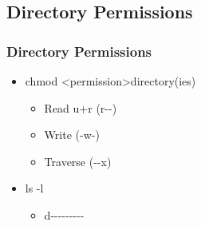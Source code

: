 \documentclass[hyperref={pdfpagelabels=false}]{beamer}
\begin{document}
\subsection{Directory Permissions}
\frame
{
    \frametitle{Directory Permissions}
    \begin{itemize}
    \item{chmod {\textless}permission\textgreater\hspace{.5 pc}directory(ies)}
        \begin{itemize}
        \item{Read u+r (r\hspace{.1 pc}-\hspace{.1 pc}-)}
        \item{Write (-\hspace{.1 pc}w\hspace{.1 pc}-)}
        \item{Traverse (-\hspace{.1 pc}-\hspace{.1 pc}x)}
        \end{itemize}
    \item{ls -l}
        \begin{itemize}
        \item{d\hspace{.1 pc}-\hspace{.1 pc}-\hspace{.1 pc}-\hspace{.1 pc}-\hspace{.1 pc}-\hspace{.1 pc}-\hspace{.1 pc}-\hspace{.1 pc}-\hspace{.1 pc}-}
        \end{itemize}
    \end{itemize}
}
\end{document}
